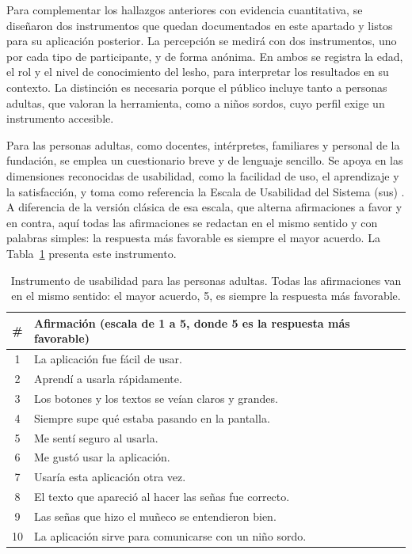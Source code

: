 Para complementar los hallazgos anteriores con evidencia cuantitativa, se diseñaron dos instrumentos que quedan documentados en este apartado y listos para su aplicación posterior. La percepción se medirá con dos instrumentos, uno por cada tipo de participante, y de forma anónima. En ambos se registra la edad, el rol y el nivel de conocimiento del \Acrshort{lesho}, para interpretar los resultados en su contexto. La distinción es necesaria porque el público incluye tanto a personas adultas, que valoran la herramienta, como a niños sordos, cuyo perfil exige un instrumento accesible.

Para las personas adultas, como docentes, intérpretes, familiares y personal de la fundación, se emplea un cuestionario breve y de lenguaje sencillo. Se apoya en las dimensiones reconocidas de usabilidad, como la facilidad de uso, el aprendizaje y la satisfacción, y toma como referencia la Escala de Usabilidad del Sistema (\acrshort{sus}) \cite{brooke_sus_1996}. A diferencia de la versión clásica de esa escala, que alterna afirmaciones a favor y en contra, aquí todas las afirmaciones se redactan en el mismo sentido y con palabras simples: la respuesta más favorable es siempre el mayor acuerdo. La Tabla~\ref{tab:instrumento} presenta este instrumento.

\begin{table}[h!]
\centering
\begin{tabular}{cl}
\hline
\textbf{\#} & \textbf{Afirmación (escala de 1 a 5, donde 5 es la respuesta más favorable)} \\
\hline
1 & La aplicación fue fácil de usar. \\
2 & Aprendí a usarla rápidamente. \\
3 & Los botones y los textos se veían claros y grandes. \\
4 & Siempre supe qué estaba pasando en la pantalla. \\
5 & Me sentí seguro al usarla. \\
6 & Me gustó usar la aplicación. \\
7 & Usaría esta aplicación otra vez. \\
8 & El texto que apareció al hacer las señas fue correcto. \\
9 & Las señas que hizo el muñeco se entendieron bien. \\
10 & La aplicación sirve para comunicarse con un niño sordo. \\
\hline
\end{tabular}
\caption{Instrumento de usabilidad para las personas adultas. Todas las afirmaciones van en el mismo sentido: el mayor acuerdo, 5, es siempre la respuesta más favorable.}
\label{tab:instrumento}
\end{table}

